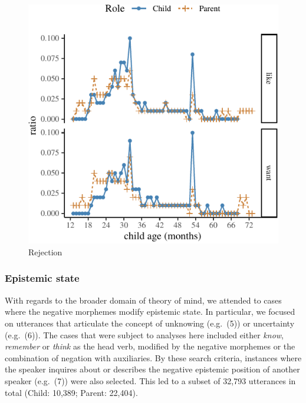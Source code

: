 \documentclass[10pt, letterpaper]{article}
\newenvironment{CodeChunk}{}{}
\begin{document}
\begin{CodeChunk}
\begin{figure}[H]

{\centering \includegraphics{figs/emotion-1} 

}

\caption[Rejection]{Rejection}\label{fig:emotion}
\end{figure}
\end{CodeChunk}

\hypertarget{epistemic-state}{%
\subsubsection{Epistemic state}\label{epistemic-state}}

With regards to the broader domain of theory of mind, we attended to
cases where the negative morphemes modify epistemic state. In
particular, we focused on utterances that articulate the concept of
unknowing (e.g.~(5)) or uncertainty (e.g.~(6)). The cases that were
subject to analyses here included either \emph{know}, \emph{remember} or
\emph{think} as the head verb, modified by the negative morphemes or the
combination of negation with auxiliaries. By these search criteria,
instances where the speaker inquires about or describes the negative
epistemic position of another speaker (e.g.~(7)) were also selected.
This led to a subset of 32,793 utterances in total (Child: 10,389;
Parent: 22,404).
\end{document}
